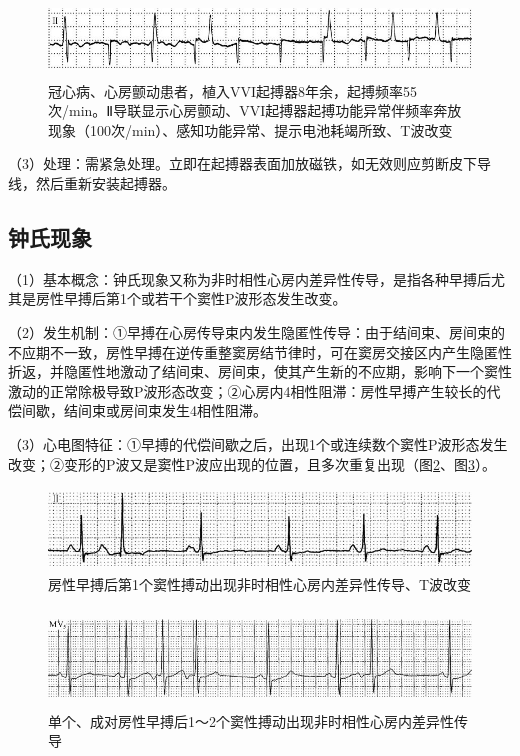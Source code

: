 \begin{figure}[!htbp]
 \centering
 \includegraphics[width=5.61458in,height=0.80208in]{./images/Image00666.jpg}
 \captionsetup{justification=centering}
 \caption{冠心病、心房颤动患者，植入VVI起搏器8年余，起搏频率55次/min。Ⅱ导联显示心房颤动、VVI起搏器起搏功能异常伴频率奔放现象（100次/min）、感知功能异常、提示电池耗竭所致、T波改变}
 \label{fig40-5}
  \end{figure} 

（3）处理：需紧急处理。立即在起搏器表面加放磁铁，如无效则应剪断皮下导线，然后重新安装起搏器。

\protect\hypertarget{text00047.htmlux5cux23subid538}{}{}

\subsection{钟氏现象}

（1）基本概念：钟氏现象又称为非时相性心房内差异性传导，是指各种早搏后尤其是房性早搏后第1个或若干个窦性P波形态发生改变。

（2）发生机制：①早搏在心房传导束内发生隐匿性传导：由于结间束、房间束的不应期不一致，房性早搏在逆传重整窦房结节律时，可在窦房交接区内产生隐匿性折返，并隐匿性地激动了结间束、房间束，使其产生新的不应期，影响下一个窦性激动的正常除极导致P波形态改变；②心房内4相性阻滞：房性早搏产生较长的代偿间歇，结间束或房间束发生4相性阻滞。

（3）心电图特征：①早搏的代偿间歇之后，出现1个或连续数个窦性P波形态发生改变；②变形的P波又是窦性P波应出现的位置，且多次重复出现（图\ref{fig40-6}、图\ref{fig40-7}）。

\begin{figure}[!htbp]
 \centering
 \includegraphics[width=4.95833in,height=0.85417in]{./images/Image00667.jpg}
 \captionsetup{justification=centering}
 \caption{房性早搏后第1个窦性搏动出现非时相性心房内差异性传导、T波改变}
 \label{fig40-6}
  \end{figure} 

\begin{figure}[!htbp]
 \centering
 \includegraphics[width=5.58333in,height=1.03125in]{./images/Image00668.jpg}
 \captionsetup{justification=centering}
 \caption{单个、成对房性早搏后1～2个窦性搏动出现非时相性心房内差异性传导}
 \label{fig40-7}
  \end{figure} 

